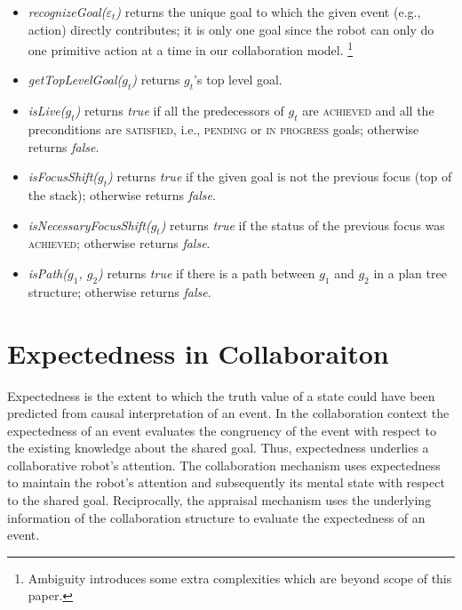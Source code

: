 \documentclass{aamas2016_extendedabstract}
\begin{document}
\vspace*{-3mm}
\begin{itemize}[leftmargin=2pt]
  \setlength\itemsep{0.01mm}
  \item \textit{recognizeGoal($\varepsilon_t$)} returns the unique goal to which
  the given event (e.g., action) directly contributes; it is only one goal since
  the robot can only do one primitive action at a time in our collaboration
  model. \footnote{Ambiguity introduces some extra complexities which are
  beyond scope of this paper.}
  
  \item \textit{getTopLevelGoal($g_t$)} returns $g_t$'s top level goal.
  
  \item \textit{isLive($g_t$)} returns \textit{true} if all the predecessors of
  $g_t$ are \textsc{achieved} and all the preconditions are \textsc{satisfied},
  i.e., \textsc{pending} or \textsc{in progress} goals; otherwise returns \textit{false}.
  
  \item \textit{isFocusShift($g_t$)} returns \textit{true} if the given
  goal is not the previous focus (top of the stack); otherwise returns
  \textit{false}.
  
  \item \textit{isNecessaryFocusShift($g_t$)} returns \textit{true} if the
  status of the previous focus was \textsc{achieved}; otherwise returns
  \textit{false}.
  
  \item \textit{isPath($g_1$, $g_2$)} returns \textit{true} if there is a path
  between $g_1$ and $g_2$ in a plan tree structure; otherwise returns
  \textit{false}.
\end{itemize}

\vspace*{-6mm}
\section{Expectedness in Collaboraiton}

Expectedness is the extent to which the truth value of a state could have been
predicted from causal interpretation of an event. In the collaboration context
the expectedness of an event evaluates the congruency of the event with respect
to the existing knowledge about the shared goal. Thus, expectedness underlies a
collaborative robot's attention. The collaboration mechanism uses expectedness
to maintain the robot's attention and subsequently its mental state with respect
to the shared goal. Reciprocally, the appraisal mechanism uses the underlying
information of the collaboration structure to evaluate the expectedness of an
event.
\end{document}
